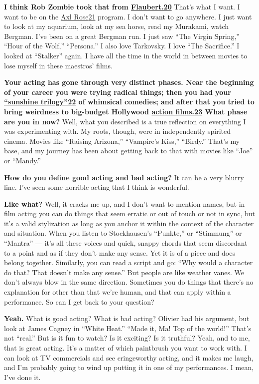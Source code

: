 \textbf{I think Rob Zombie took that from
\href{http://nytimes3xbfgragh.onion\#tooltip-20}{Flaubert.20}} That's
what I want. I want to be on the
\href{http://nytimes3xbfgragh.onion\#tooltip-21}{Axl
Rose}\href{http://nytimes3xbfgragh.onion\#tooltip-21}{21} program. I
don't want to go anywhere. I just want to look at my aquarium, look at
my sea horse, read my Murakami, watch Bergman. I've been on a great
Bergman run. I just saw ``The Virgin Spring,'' ``Hour of the Wolf,''
``Persona.'' I also love Tarkovsky. I love ``The Sacrifice.'' I looked
at ``Stalker'' again. I have all the time in the world in between movies
to lose myself in these maestros' films.

\textbf{Your acting has gone through very distinct phases. Near the
beginning of your career you were trying radical things; then you had
your \href{http://nytimes3xbfgragh.onion\#tooltip-22}{``sunshine
trilogy''}\href{http://nytimes3xbfgragh.onion\#tooltip-22}{22} of
whimsical comedies; and after that you tried to bring weirdness to
big-budget Hollywood
\href{http://nytimes3xbfgragh.onion\#tooltip-23}{action films.23} What
phase are you in now?} Well, what you described is a true reflection on
everything I was experimenting with. My roots, though, were in
independently spirited cinema. Movies like ``Raising Arizona,''
``Vampire's Kiss,'' ``Birdy.'' That's my base, and my journey has been
about getting back to that with movies like ``Joe'' or ``Mandy.''

\textbf{How do you define good acting and bad acting?} It can be a very
blurry line. I've seen some horrible acting that I think is wonderful.

\textbf{Like what?} Well, it cracks me up, and I don't want to mention
names, but in film acting you can do things that seem erratic or out of
touch or not in sync, but it's a valid stylization as long as you anchor
it within the context of the character and situation. When you listen to
Stockhausen's ``Punkte,'' or ``Stimmung'' or ``Mantra'' --- it's all
these voices and quick, snappy chords that seem discordant to a point
and as if they don't make any sense. Yet it is of a piece and does
belong together. Similarly, you can read a script and go: ``Why would a
character do that? That doesn't make any sense.'' But people are like
weather vanes. We don't always blow in the same direction. Sometimes you
do things that there's no explanation for other than that we're human,
and that can apply within a performance. So can I get back to your
question?

\textbf{Yeah.} What is good acting? What is bad acting? Olivier had his
argument, but look at James Cagney in ``White Heat.'' ``Made it, Ma! Top
of the world!'' That's not ``real.'' But is it fun to watch? Is it
exciting? Is it truthful? Yeah, and to me, that is great acting. It's a
matter of which paintbrush you want to work with. I can look at TV
commercials and see cringeworthy acting, and it makes me laugh, and I'm
probably going to wind up putting it in one of my performances. I mean,
I've done it.

